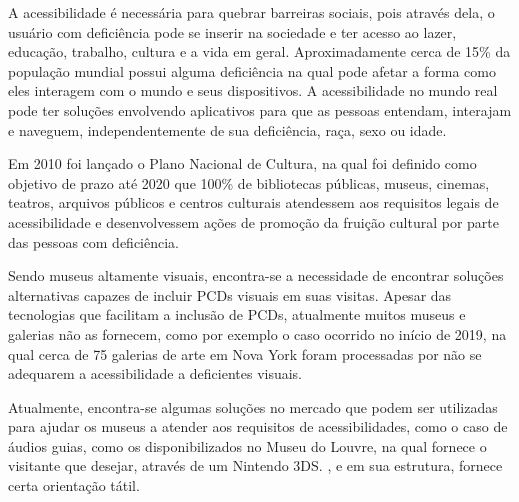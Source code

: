 
	



A acessibilidade é necessária para quebrar barreiras sociais, pois através dela, o usuário com deficiência pode se inserir na sociedade e ter acesso ao lazer, educação, trabalho, cultura e a vida em geral. Aproximadamente cerca de 15\% da população mundial possui alguma deficiência \cite{OMS:Disability} na qual pode afetar a forma como eles interagem com o mundo e seus dispositivos. A acessibilidade no mundo real pode ter soluções envolvendo aplicativos para que as pessoas entendam, interajam e naveguem, independentemente de sua deficiência, raça, sexo ou idade.

Em 2010 foi lançado o Plano Nacional de Cultura, na qual foi definido como objetivo de prazo até 2020 que 100\% de bibliotecas públicas, museus, cinemas, teatros, arquivos públicos e centros culturais atendessem aos requisitos legais de acessibilidade e desenvolvessem ações de promoção da fruição cultural por parte das pessoas com deficiência. \cite{Ipea:Metas} 

Sendo museus altamente visuais, encontra-se a necessidade de encontrar soluções alternativas capazes de incluir PCDs visuais em suas visitas. Apesar das tecnologias que facilitam a inclusão de PCDs, atualmente muitos museus e galerias não as fornecem, como por exemplo o caso ocorrido no início de 2019, na qual cerca de 75 galerias de arte em Nova York foram processadas por não se adequarem a acessibilidade a deficientes visuais. \cite{NYT:Blind} 

Atualmente, encontra-se algumas soluções no mercado que podem ser utilizadas para ajudar os museus a atender aos requisitos de acessibilidades, como o caso de áudios guias, como os disponibilizados no Museu do Louvre, na qual fornece o visitante que desejar, através de um Nintendo 3DS. \cite{Nintendo:Louvre}, e em sua estrutura, fornece certa orientação tátil.

